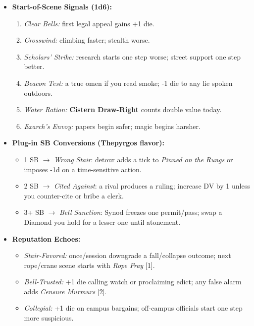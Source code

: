 \begin{itemize}
  \item \textbf{Start-of-Scene Signals (1d6):}
  \begin{enumerate}
    \item \emph{Clear Bells:} first legal appeal gains +1 die.
    \item \emph{Crosswind:} climbing faster; stealth worse.
    \item \emph{Scholars’ Strike:} research starts one step worse; street support one step better.
    \item \emph{Beacon Test:} a true omen if you read smoke; -1 die to any lie spoken outdoors.
    \item \emph{Water Ration:} \textbf{Cistern Draw-Right} counts double value today.
    \item \emph{Exarch’s Envoy:} papers begin safer; magic begins harsher.
  \end{enumerate}

  \item \textbf{Plug-in SB Conversions (Thepyrgos flavor):}
  \begin{itemize}
    \item 1 SB \(\rightarrow\) \emph{Wrong Stair}: detour adds a tick to \emph{Pinned on the Rungs} or imposes -1d on a time-sensitive action.
    \item 2 SB \(\rightarrow\) \emph{Cited Against}: a rival produces a ruling; increase DV by 1 unless you counter-cite or bribe a clerk.
    \item 3+ SB \(\rightarrow\) \emph{Bell Sanction}: Synod freezes one permit/pass; swap a Diamond you hold for a lesser one until atonement.
  \end{itemize}

  \item \textbf{Reputation Echoes:}
  \begin{itemize}
    \item \emph{Stair-Favored:} once/session downgrade a fall/collapse outcome; next rope/crane scene starts with \emph{Rope Fray} [1].
    \item \emph{Bell-Trusted:} +1 die calling watch or proclaiming edict; any false alarm adds \emph{Censure Murmurs} [2].
    \item \emph{Collegial:} +1 die on campus bargains; off-campus officials start one step more suspicious.
  \end{itemize}
\end{itemize}
